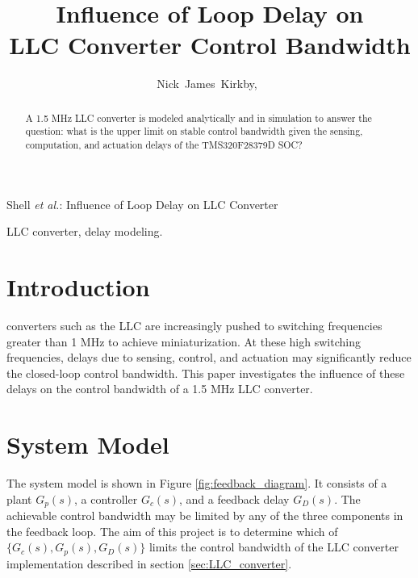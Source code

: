 \documentclass[journal]{IEEEtran}
\begin{document}
\title{Influence of Loop Delay on \\LLC Converter Control Bandwidth}

\author{Nick~James~Kirkby,~} %

\markboth{}
{Shell \MakeLowercase{\textit{et al.}}: Influence of Loop Delay on LLC Converter}


\maketitle

\begin{abstract}
A 1.5 MHz LLC converter is modeled analytically and in simulation to answer the question: what is the upper limit on stable control bandwidth given the sensing, computation, and actuation delays of the TMS320F28379D SOC?
\end{abstract}

\begin{IEEEkeywords}
LLC converter, delay modeling.
\end{IEEEkeywords}


\IEEEpeerreviewmaketitle


\section{Introduction}
 converters such as the LLC are increasingly pushed to switching frequencies greater than 1 MHz to achieve miniaturization. 
At these high switching frequencies, delays due to sensing, control, and actuation may significantly reduce the closed-loop control bandwidth.
This paper investigates the influence of these delays on the control bandwidth of a 1.5 MHz LLC converter.

\section{System Model}

The system model is shown in Figure \ref{fig:feedback_diagram}. 
It consists of a plant $G_p(s)$, a controller $G_c(s)$, and a feedback delay $G_D(s)$.
The achievable control bandwidth may be limited by any of the three components in the feedback loop.
The aim of this project is to determine which of $ \{ G_c(s), G_p(s), G_D(s) \} $ limits the control bandwidth of the LLC converter implementation described in section \ref{sec:LLC_converter}.
\end{document}
